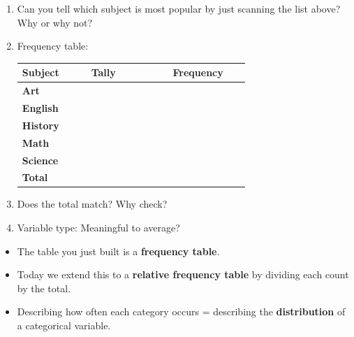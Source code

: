\documentclass[10pt]{article}
\begin{document}
\begin{enumerate}

  \item Can you tell which subject is most popular by just scanning the list above?
        Why or why not?\\[4pt]

  \item Frequency table:

\vspace{0.1in}
\renewcommand{\arraystretch}{1.8}
\begin{tabularx}{\linewidth}{@{} >{\bfseries}p{0.22\linewidth}
                                    C{0.26\linewidth} C{0.2\linewidth} @{}}
\textbf{Subject} & \textbf{Tally} & \textbf{Frequency} \\
\midrule
Art     & \ans{|||} &  \\
English & \ans{||||} &  \\
History & \ans{||} &  \\
Math    & \ans{||||||} &  \\
Science & \ans{|||||} &  \\
\midrule
{}\textbf{Total} & &  \\
\end{tabularx}

  \item Does the total match? \quad
        Why check? 

  \item Variable type: \quad
        Meaningful to average? 

\end{enumerate}

\vspace{0.14in}

\begin{tcolorbox}[colback=greenbg, colframe=greenacc, boxrule=0.8pt, arc=2mm,
    left=4mm, right=4mm, top=3mm, bottom=3mm]
\small
\begin{itemize}[leftmargin=1.3em, itemsep=6pt]
  \item The table you just built is a \textbf{frequency table}.
  \item Today we extend this to a \textbf{relative frequency table} by dividing each
        count by the total.
  \item Describing how often each category occurs = describing the
        \textbf{distribution} of a categorical variable.
\end{itemize}
\end{tcolorbox}
\end{document}
